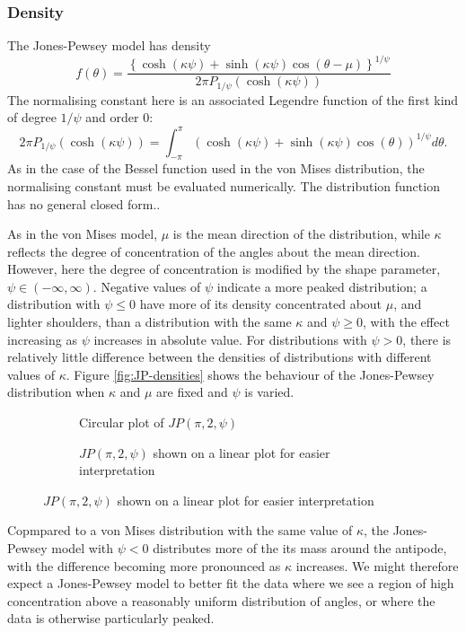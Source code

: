 \documentclass[../../ArchStats.tex]{subfiles}
\begin{document}
\subsubsection{Density}
The Jones-Pewsey model has density
\[f(\theta) = \frac{\left\lbrace \cosh(\kappa\psi) + \sinh(\kappa\psi) \cos(\theta - \mu) \right\rbrace ^ {1/\psi}}{2\pi P_{1/\psi}(\cosh(\kappa\psi))}\]
The normalising constant here is an associated Legendre function of the first kind of degree $1/\psi$ and order 0:
\[2\pi P_{1/\psi}(\cosh(\kappa\psi)) = \int_{-\pi}^\pi \left( \cosh(\kappa \psi) + \sinh(\kappa\psi)\cos(\theta)\right)^{1/\psi}d\theta.\]
As in the case of the Bessel function used in the von Mises distribution, the normalising constant must be evaluated numerically. The distribution function has no general closed form..

As in the von Mises model, $\mu$ is the mean direction of the distribution, while $\kappa$ reflects the degree of concentration of the angles about the mean direction. However, here the degree of concentration is modified by the shape parameter, $\psi \in (-\infty, \infty)$. Negative values of $\psi$ indicate a more peaked distribution; a distribution with $\psi \leq 0$ have more of its density concentrated about $\mu$, and lighter shoulders, than a distribution with the same $\kappa$ and $\psi \geq 0$, with the effect increasing as $\psi$ increases in absolute value. For distributions with $\psi > 0$, there is relatively little difference between the densities of distributions with different values of $\kappa$. Figure \ref{fig:JP-densities} shows the behaviour of the Jones-Pewsey distribution when $\kappa$ and $\mu$ are fixed and $\psi$ is varied. 

\begin{figure}[!h]
\centering
\caption{Jones-Pewsey densities with varying $\psi$; $\mu = \pi$, $\kappa = 2$}
\label{fig:JP-densities}
%
\begin{subfigure}[t]{0.45\textwidth}
\caption{Circular plot of $JP(\pi, 2, \psi)$}
\end{subfigure}
%
\begin{subfigure}[t]{0.45\textwidth}
\caption{$JP(\pi, 2, \psi)$ shown on a linear plot for easier interpretation}
\end{subfigure}
%
\end{figure}

Copmpared to a von Mises distribution with the same value of $\kappa$, the Jones-Pewsey model with $\psi < 0$ distributes more of the its mass around the antipode, with the difference becoming more pronounced as $\kappa$ increases. We might therefore expect a Jones-Pewsey model to better fit the data where we see a region of high concentration above a reasonably uniform distribution of angles, or where the data is otherwise particularly peaked.
\end{document}
